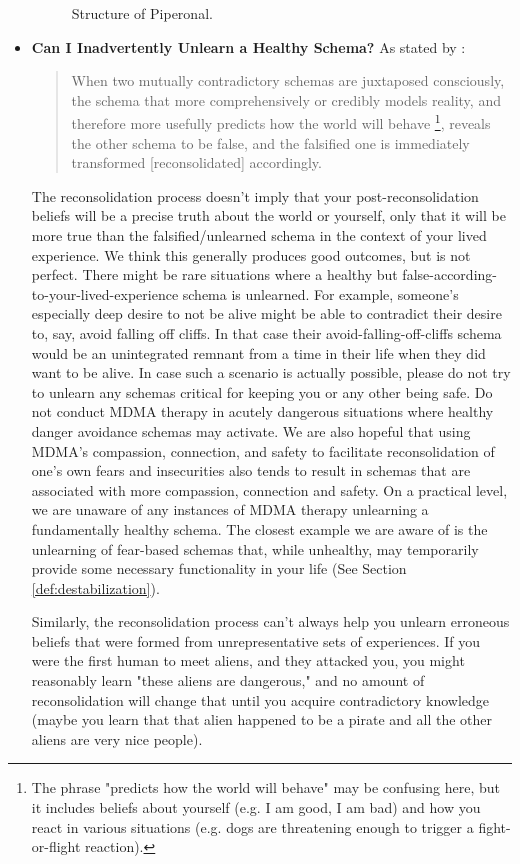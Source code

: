 \documentclass[12pt,letterpaper]{book}
\begin{document}
\begin{itemize}
\begin{figure}[htbp]
            \centering
            \caption{Structure of Piperonal.}
            \label{fig:piperonal}
        \end{figure}
        \FloatBarrier
    \item \textbf{Can I Inadvertently Unlearn a Healthy Schema?}
        \label{unlearnHealthy}
        As stated by \textcite{ecker2015misunderstood}:
        \begin{quotation}
         When two mutually contradictory schemas are juxtaposed consciously, the schema that more comprehensively or credibly models reality, and therefore more usefully predicts how the world will behave \footnote{The phrase "predicts how the world will behave" may be confusing here, but it includes beliefs about yourself (e.g. I am good, I am bad) and how you react in various situations (e.g. dogs are threatening enough to trigger a fight-or-flight reaction).}, reveals the other schema to be false, and the falsified one is immediately transformed [reconsolidated] accordingly.
        \end{quotation}
        The reconsolidation process doesn't imply that your post-reconsolidation beliefs will be a precise truth about the world or yourself, only that it will be more true than the falsified/unlearned schema in the context of your lived experience. We think this generally produces good outcomes, but is not perfect. There might be rare situations where a healthy but false-according-to-your-lived-experience schema is unlearned. For example, someone's especially deep desire to not be alive might be able to contradict their desire to, say, avoid falling off cliffs. In that case their avoid-falling-off-cliffs schema would be an unintegrated remnant from a time in their life when they did want to be alive. In case such a scenario is actually possible, please do not try to unlearn any schemas critical for keeping you or any other being safe. Do not conduct MDMA therapy in acutely dangerous situations where healthy danger avoidance schemas may activate. We are also hopeful that using MDMA's compassion, connection, and safety to facilitate reconsolidation of one's own fears and insecurities also tends to result in schemas that are associated with more compassion, connection and safety. On a practical level, we are unaware of any instances of MDMA therapy unlearning a fundamentally healthy schema. The closest example we are aware of is the unlearning of fear-based schemas that, while unhealthy, may temporarily provide some necessary functionality in your life (See Section \ref{def:destabilization}).
        
        Similarly, the reconsolidation process can't always help you unlearn erroneous beliefs that were formed from unrepresentative sets of experiences. If you were the first human to meet aliens, and they attacked you, you might reasonably learn "these aliens are dangerous," and no amount of reconsolidation will change that until you acquire contradictory knowledge (maybe you learn that that alien happened to be a pirate and all the other aliens are very nice people).
\end{itemize}
\end{document}
